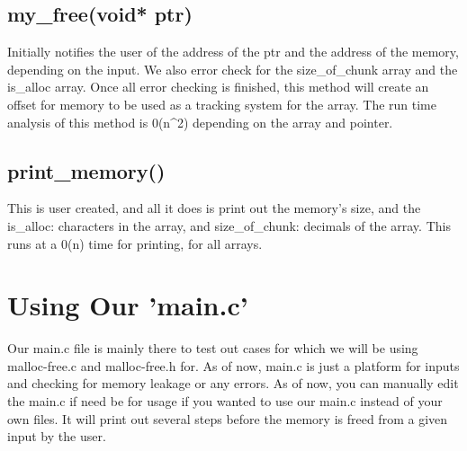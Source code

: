 \documentclass{article}
\begin{document}
\subsection*{my\_free(void* ptr)}
Initially notifies the user of the address of the ptr and the address of the memory, depending on the input.  We also error check for the size\_of\_chunk array and the is\_alloc array.  Once all error checking is finished, this method will create an offset for memory to be used as a tracking system for the array.  The run time analysis of this method is 0(n^2) depending on the array and pointer.

\subsection*{print\_memory()}
This is user created, and all it does is print out the memory's size, and the is\_alloc: characters in the array, and size_of_chunk: decimals of the array.
This runs at a 0(n) time for printing, for all arrays.


\section{Using Our 'main.c'}
Our main.c file is mainly there to test out cases for which we will be using malloc-free.c and malloc-free.h for.  As of now, main.c is just a platform for inputs and checking for memory leakage or any errors.  As of now, you can manually edit the main.c if need be for usage if you wanted to use our main.c instead of your own files.  It will print out several steps before the memory is freed from a given input by the user. 
\end{document}
